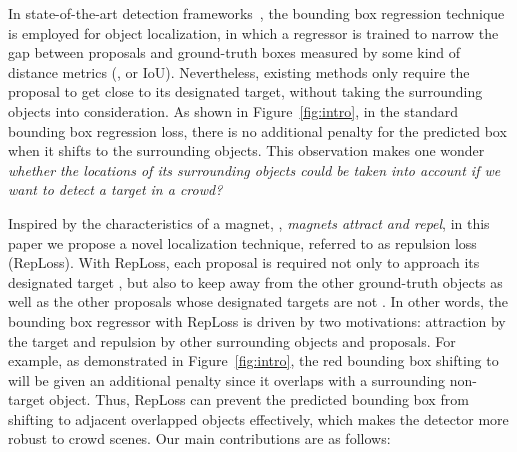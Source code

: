 \documentclass[10pt,twocolumn,letterpaper]{article}
\begin{document}
In state-of-the-art detection frameworks~\cite{Girshick_2015_ICCV,NIPS2015_5638,dai2016r,Lin_2017_CVPR}, the bounding box regression technique is employed for object localization, in which a regressor is trained to narrow the gap between proposals and ground-truth boxes measured by some kind of distance metrics (\eg,  or IoU). Nevertheless, existing methods only require the proposal to get close to its designated target, without taking the surrounding objects into consideration. As shown in Figure~\ref{fig:intro}, in the standard bounding box regression loss, there is no additional penalty for the predicted box when it shifts to the surrounding objects. This observation makes one wonder {\it whether the locations of its surrounding objects could be taken into account if we want to detect a target in a crowd?}

Inspired by the characteristics of a magnet, \ie, {\it magnets attract and repel}, in this paper we propose a novel localization technique, referred to as repulsion loss (RepLoss). With RepLoss, each proposal is required not only to approach its designated target , but also to keep away from the other ground-truth objects as well as the other proposals whose designated targets are not . In other words, the bounding box regressor with RepLoss is driven by two motivations: attraction by the target and repulsion by other surrounding objects and proposals. For example, as demonstrated in Figure~\ref{fig:intro}, the red bounding box shifting to  will be given an additional penalty since it overlaps with a surrounding non-target object. Thus, RepLoss can prevent the predicted bounding box from shifting to adjacent overlapped objects effectively, which makes the detector more robust to crowd scenes. Our main contributions are as follows:
\end{document}
